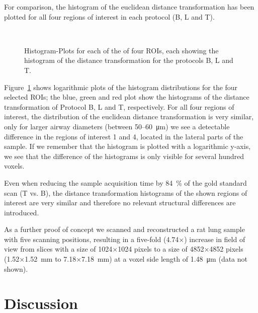 \documentclass[preprint,s]{iucr}
\newcommand{\imsize}{\linewidth}
\begin{document}
For comparison, the histogram of the euclidean distance transformation has been plotted for all four regions of interest in each protocol (B, L and T).

\renewcommand{\imsize}{.5\columnwidth}
\begin{figure}
	\centering
	\caption{Histogram-Plots for each of the of four ROIs, each showing the histogram of the distance transformation for the protocols B, L and T.}%
	\\%
	\label{fig:DTFplots}
\end{figure}

Figure~\ref{fig:DTFplots} shows logarithmic plots of the histogram distributions for the four selected ROIs; the blue, green and red plot show the histograms of the distance transformation of Protocol B, L and T, respectively. For all four regions of interest, the distribution of the euclidean distance transformation is very similar, only for larger airway diameters (between 50--\SI{60}{\micro\meter}) we see a detectable difference in the regions of interest 1 and 4, located in the lateral parts of the sample. If we remember that the histogram is plotted with a logarithmic y-axis, we see that the difference of the histograms is only visible for several hundred voxels.

Even when reducing the sample acquisition time by \SI{84}{\percent} of the gold standard scan (T vs. B), the distance transformation histograms of the shown regions of interest are very similar and therefore no relevant structural differences are introduced.

As a further proof of concept we scanned and reconstructed a rat lung sample with five scanning positions, resulting in a five-fold (4.74$\times$) increase in field of view from slices with a size of 1024$\times$1024 pixels to a size of 4852$\times$4852 pixels (1.52$\times$\SI{1.52}{\milli\meter} to 7.18$\times$\SI{7.18}{\milli\meter}) at a voxel side length of \SI{1.48}{\micro\meter} (data not shown).
\section{Discussion}\label{sec:Discussion}
\end{document}
